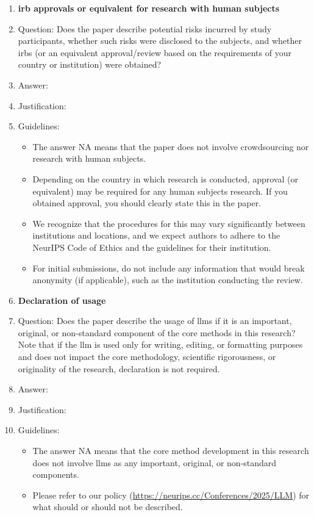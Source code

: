 \documentclass{article}
\begin{document}
\begin{enumerate}
\item {\bf \Gls{irb} approvals or equivalent for research with human subjects}
  \item[] Question: Does the paper describe potential risks incurred by study participants, whether such risks were disclosed to the subjects, and whether \glspl{irb} (or an equivalent approval/review based on the requirements of your country or institution) were obtained?
    \item[] Answer: \answerTODO{} %
    \item[] Justification: \justificationTODO{}
    \item[] Guidelines:
    \begin{itemize}
        \item The answer NA means that the paper does not involve crowdsourcing nor research with human subjects.
        \item Depending on the country in which research is conducted,  approval (or equivalent) may be required for any human subjects research. If you obtained  approval, you should clearly state this in the paper. 
        \item We recognize that the procedures for this may vary significantly between institutions and locations, and we expect authors to adhere to the NeurIPS Code of Ethics and the guidelines for their institution. 
        \item For initial submissions, do not include any information that would break anonymity (if applicable), such as the institution conducting the review.
    \end{itemize}

\item {\bf Declaration of  usage}
  \item[] Question: Does the paper describe the usage of \glspl{llm} if it is an important, original, or non-standard component of the core methods in this research? Note that if the \gls{llm} is used only for writing, editing, or formatting purposes and does not impact the core methodology, scientific rigorousness, or originality of the research, declaration is not required.
    \item[] Answer: \answerTODO{} %
    \item[] Justification: \justificationTODO{}
    \item[] Guidelines:
    \begin{itemize}
        \item The answer NA means that the core method development in this research does not involve \glspl{llm} as any important, original, or non-standard components.
        \item Please refer to our  policy (\url{https://neurips.cc/Conferences/2025/LLM}) for what should or should not be described.
    \end{itemize}

\end{enumerate}
\end{document}
